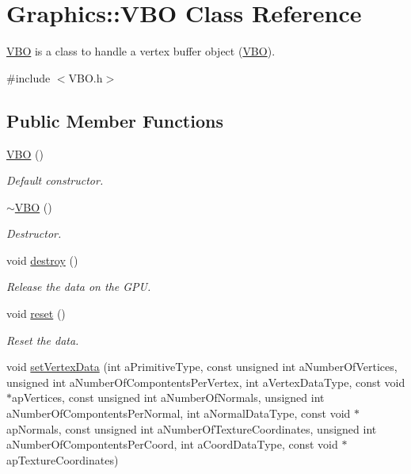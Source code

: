 \hypertarget{class_graphics_1_1_v_b_o}{
\section{Graphics::VBO Class Reference}
\label{class_graphics_1_1_v_b_o}
}


\hyperlink{class_graphics_1_1_v_b_o}{VBO} is a class to handle a vertex buffer object (\hyperlink{class_graphics_1_1_v_b_o}{VBO}).  




{\ttfamily \#include $<$VBO.h$>$}

\subsection*{Public Member Functions}
\begin{DoxyCompactItemize}
\item 
\hyperlink{class_graphics_1_1_v_b_o_a5fdd4892ea05b7d9609270183247feb1}{VBO} ()
\begin{DoxyCompactList}\small\item\em Default constructor. \end{DoxyCompactList}\item 
\hyperlink{class_graphics_1_1_v_b_o_a0f393478113752bf9baa4324497cdf63}{$\sim$VBO} ()
\begin{DoxyCompactList}\small\item\em Destructor. \end{DoxyCompactList}\item 
void \hyperlink{class_graphics_1_1_v_b_o_ae5b7f5a0ba9e52a80691d3239ed7ca76}{destroy} ()
\begin{DoxyCompactList}\small\item\em Release the data on the GPU. \end{DoxyCompactList}\item 
void \hyperlink{class_graphics_1_1_v_b_o_a499016a22e57972350cb4d79fb2fc683}{reset} ()
\begin{DoxyCompactList}\small\item\em Reset the data. \end{DoxyCompactList}\item 
void \hyperlink{class_graphics_1_1_v_b_o_a904d82132f6bc0151adbbfef15664b58}{setVertexData} (int aPrimitiveType, const unsigned int aNumberOfVertices, unsigned int aNumberOfCompontentsPerVertex, int aVertexDataType, const void $\ast$apVertices, const unsigned int aNumberOfNormals, unsigned int aNumberOfCompontentsPerNormal, int aNormalDataType, const void $\ast$apNormals, const unsigned int aNumberOfTextureCoordinates, unsigned int aNumberOfCompontentsPerCoord, int aCoordDataType, const void $\ast$apTextureCoordinates)

\end{DoxyCompactItemize}
